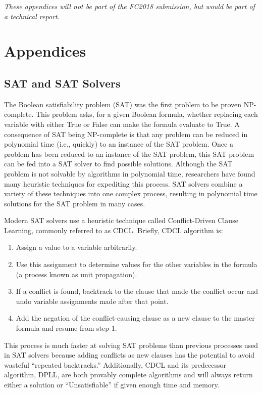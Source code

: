 \documentclass[runningheads]{llncs}
\newif\iflongversion
\begin{document}


\iflongversion
\newpage
\emph{These appendices will not be part of the FC2018 submission, but
  would be part of a technical report.}

\section{Appendices}

\subsection{SAT and SAT Solvers}

The Boolean satisfiability problem (SAT) was the first
problem to be proven NP-complete\cite{cooklevin}. This problem asks,
for a given Boolean formula, whether replacing each variable with
either True or False can make the formula evaluate to True.  A
consequence of SAT being NP-complete is that any problem can be
reduced in polynomial time (i.e., quickly) to an instance of the SAT
problem. Once a problem has been reduced to an instance of the SAT
problem, this SAT problem can be fed into a SAT solver to find
possible solutions. Although the SAT problem is not solvable by
algorithms in polynomial time, researchers have found many heuristic
techniques for expediting this process. SAT solvers combine a variety
of these techniques into one complex process, resulting in polynomial
time solutions for the SAT problem in many cases.

Modern SAT solvers use a heuristic technique called Conflict-Driven
Clause Learning, commonly referred to as CDCL\cite{cdcl}. Briefly, CDCL algorithm
is:

\begin{enumerate}

\item Assign a value to a variable arbitrarily.
\item Use this assignment to determine values for the other variables
  in the formula (a process known as unit propagation).
\item If a conflict is found, backtrack to the clause that made the
  conflict occur and undo variable assignments made after that point.
\item Add the negation of the conflict-causing clause as a new clause
  to the master formula and resume from step 1.

\end{enumerate}

This process is much faster at solving SAT problems than previous
processes used in SAT solvers because adding conflicts as new clauses
has the potential to avoid wasteful ``repeated backtracks.''
Additionally, CDCL and its predecessor algorithm, DPLL, are both
provably complete algorithms and will always return either a solution
or ``Unsatisfiable'' if given enough time and memory.
\end{document}
